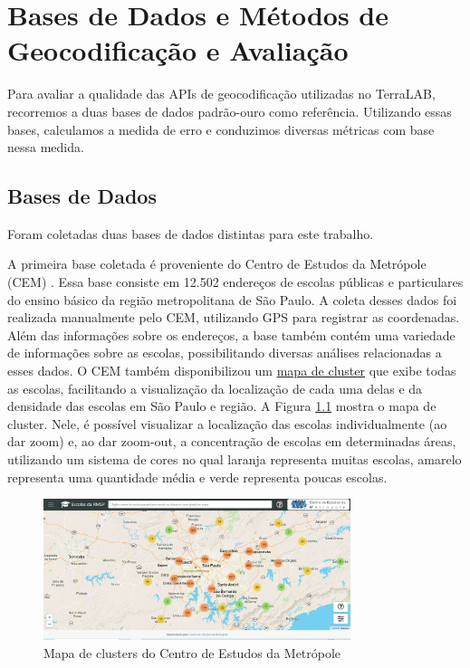 \chapter{Bases de Dados e Métodos de Geocodificação e Avaliação} \label{desenvolvimento}

Para avaliar a qualidade das APIs de geocodificação utilizadas no TerraLAB, recorremos a duas bases de dados padrão-ouro como referência. Utilizando essas bases, calculamos a medida de erro e conduzimos diversas métricas com base nessa medida.

\section{Bases de Dados}
Foram coletadas duas bases de dados distintas para este trabalho.

A primeira base coletada é proveniente do Centro de Estudos da Metrópole (CEM) \cite{cem}. Essa base consiste em 12.502 endereços de escolas públicas e particulares do ensino básico da região metropolitana de São Paulo. A coleta desses dados foi realizada manualmente pelo CEM, utilizando GPS para registrar as coordenadas. Além das informações sobre os endereços, a base também contém uma variedade de informações sobre as escolas, possibilitando diversas análises relacionadas a esses dados. O CEM também disponibilizou um \href{http://200.144.244.241:3002/geolocation}{mapa de cluster} que exibe todas as escolas, facilitando a visualização da localização de cada uma delas e da densidade das escolas em São Paulo e região. A Figura \ref{fig:siteCEM} mostra o mapa de cluster. Nele, é possível visualizar a localização das escolas individualmente (ao dar zoom) e, ao dar zoom-out, a concentração de escolas em determinadas áreas, utilizando um sistema de cores no qual laranja representa muitas escolas, amarelo representa uma quantidade média e verde representa poucas escolas. 

\begin{figure} 
    \centering
    \includegraphics[width=0.8\textwidth]{Figuras/siteCEM.jpeg}
    \caption{Mapa de clusters do Centro de Estudos da Metrópole}
    \label{fig:siteCEM}
\end{figure} 

